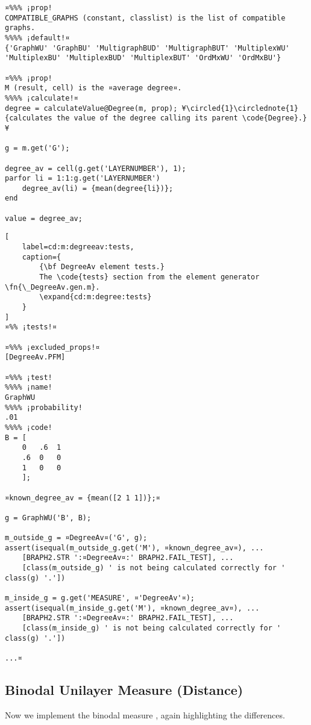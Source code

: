 \documentclass{tufte-handout}
\begin{document}
\begin{lstlisting}
¤%%% ¡prop!
COMPATIBLE_GRAPHS (constant, classlist) is the list of compatible graphs.
%%%% ¡default!¤
{'GraphWU' 'GraphBU' 'MultigraphBUD' 'MultigraphBUT' 'MultiplexWU' 'MultiplexBU' 'MultiplexBUD' 'MultiplexBUT' 'OrdMxWU' 'OrdMxBU'}

¤%%% ¡prop!
M (result, cell) is the ¤average degree¤.
%%%% ¡calculate!¤
degree = calculateValue@Degree(m, prop); ¥\circled{1}\circlednote{1}{calculates the value of the degree calling its parent \code{Degree}.}¥

g = m.get('G');

degree_av = cell(g.get('LAYERNUMBER'), 1);
parfor li = 1:1:g.get('LAYERNUMBER')
    degree_av(li) = {mean(degree{li})};
end

value = degree_av;
\end{lstlisting}

\begin{lstlisting}[
	label=cd:m:degreeav:tests,
	caption={
		{\bf DegreeAv element tests.}
		The \code{tests} section from the element generator \fn{\_DegreeAv.gen.m}.
		\expand{cd:m:degree:tests}
	}
]
¤%% ¡tests!¤

¤%%% ¡excluded_props!¤
[DegreeAv.PFM]

¤%%% ¡test!
%%%% ¡name!
GraphWU
%%%% ¡probability!
.01
%%%% ¡code!
B = [
    0   .6  1
    .6  0   0
    1   0   0
    ];

¤known_degree_av = {mean([2 1 1])};¤

g = GraphWU('B', B);

m_outside_g = ¤DegreeAv¤('G', g);
assert(isequal(m_outside_g.get('M'), ¤known_degree_av¤), ...
    [BRAPH2.STR ':¤DegreeAv¤:' BRAPH2.FAIL_TEST], ...
    [class(m_outside_g) ' is not being calculated correctly for ' class(g) '.'])

m_inside_g = g.get('MEASURE', ¤'DegreeAv'¤);
assert(isequal(m_inside_g.get('M'), ¤known_degree_av¤), ...
    [BRAPH2.STR ':¤DegreeAv¤:' BRAPH2.FAIL_TEST], ...
    [class(m_inside_g) ' is not being calculated correctly for ' class(g) '.'])

...¤
\end{lstlisting}

\clearpage
\subsection{Binodal Unilayer Measure (Distance)}

Now we implement the binodal measure , again highlighting the differences.
\end{document}

